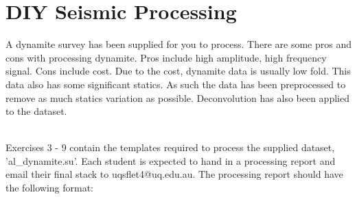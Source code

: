 \section*{DIY Seismic Processing}
A dynamite survey has been supplied for you to process.  There are some pros and cons with processing dynamite.  Pros include high amplitude, high frequency signal.  Cons include cost.  Due to the cost, dynamite data is usually low fold.  This data also has some significant statics.  As such the data has been preprocessed to remove as much statics variation as possible.  Deconvolution has also been applied to the dataset.
\par~\\
Exercises 3 - 9 contain the templates required to process the supplied dataset, 'al\_dynamite.su'.  Each student is expected to hand in a processing report and email their final stack to uqsflet4@uq.edu.au.  The processing report should have the following format:
\par~\\
